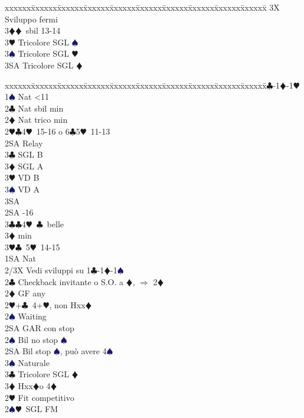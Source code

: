 \documentclass[a4paper,italian]{article}
\newcommand{\BC}{\textcolor{OliveGreen}{$\clubsuit$}}
\newcommand{\BD}{\textcolor{RedOrange}{$\vardiamondsuit$}}
\newcommand{\BH}{\textcolor{Red2}{$\varheartsuit${}}}
\newcommand{\BS}{\textcolor{MidnightBlue}{$\spadesuit${}}}
\newenvironment{bidtable}
{\begin{tabbing}

    xxxxxx\=xxxxxx\=xxxxxx\=xxxxxx\=xxxxxx\=xxxxxx\=xxxxxx\=xxxxxx\=xxxxxx\=xxxxxx\=\kill}
{\end{tabbing} }%
\begin{document}
\begin{multicols}{2}
\begin{bidtable}
        3X \> Sviluppo fermi\-\\
        3\BD {}\BD\ sbil 13-14\\
        3\BH \> Tricolore SGL \BS \\
        3\BS \> Tricolore SGL \BH \\
        3SA \> Tricolore SGL \BD \-
    \end{bidtable}
    \begin{bidtable}
        1\BC-1\BD-1\BH\+\\
        1\BS \> Nat <11\+\\
        2\BC \> Nat sbil min\\
        2\BD \> Nat trico min\\
        2\BH {}\BC 4\BH\ 15-16 o 6\BC 5\BH\ 11-13\+\\
        2SA \> Relay\+\\
        3\BC {} SGL B\\
        3\BD {} SGL A\\
        3\BH {} VD B\\
        3\BS {} VD A\\
        3SA \-\-\\
        2SA -16\\
        3\BC {}\BC 4\BH\ \BC\ belle\\
        3\BD {} min\\
        3\BH {}\BC\ 5\BH\ 14-15\-\\
        1SA \> Nat\+\\
        2/3X \> Vedi sviluppi su 1\BC -1\BD -1\BS \-\\
        2\BC \> Checkback invitante o S.O. a \BD , $\Rightarrow$ 2\BD \\
        2\BD \> GF any\+\\
        2\BH {}+\BC\ 4+\BH, non Hxx\BD\+\\
        2\BS\> Waiting\\
        2SA \> GAR con stop\-\\
        2\BS \> Bil no stop \BS \\
        2SA \> Bil stop \BS , può avere 4\BS \+\\
        3\BS \> Naturale\-\\
        3\BC \> Tricolore SGL \BD \\
        3\BD \> Hxx\BD o 4\BD\-\\
        [2pt]2\BH \> Fit competitivo\\
        2\BS {}\BH\ SGL FM\+\\

\end{bidtable}
\end{multicols}
\end{document}
